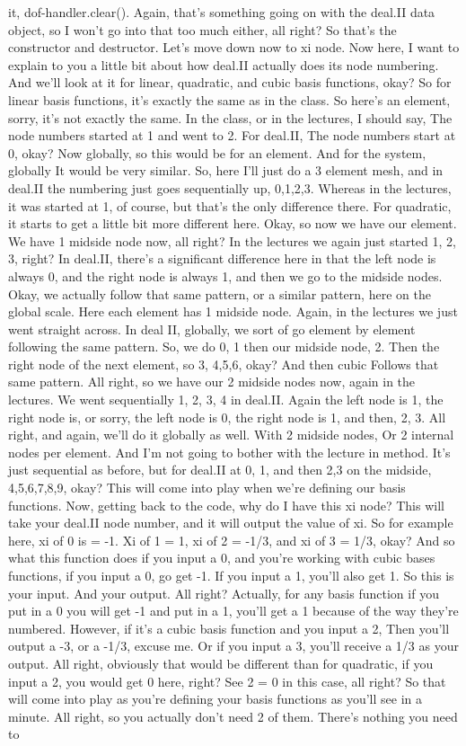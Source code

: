 \documentclass[10pt]{article}
\begin{document}
it, dof-handler.clear(). Again, that's something going on with the deal.II data object, so I won't go into that too much either, all right? So that's the constructor and destructor. Let's move down now to xi node. Now here, I want to explain to you a little bit about how deal.II actually does its node numbering. And we'll look at it for linear, quadratic, and cubic basis functions, okay? So for linear basis functions, it's exactly the same as in the class. So here's an element, sorry, it's not exactly the same. In the class, or in the lectures, I should say, The node numbers started at 1 and went to 2. For deal.II, The node numbers start at 0, okay? Now globally, so this would be for an element. And for the system, globally It would be very similar. So, here I'll just do a 3 element mesh, and in deal.II the numbering just goes sequentially up, 0,1,2,3. Whereas in the lectures, it was started at 1, of course, but that's the only difference there. For quadratic, it starts to get a little bit more different here. Okay, so now we have our element. We have 1 midside node now, all right? In the lectures we again just started 1, 2, 3, right? In deal.II, there's a significant difference here in that the left node is always 0, and the right node is always 1, and then we go to the midside nodes. Okay, we actually follow that same pattern, or a similar pattern, here on the global scale. Here each element has 1 midside node. Again, in the lectures we just went straight across. In deal II, globally, we sort of go element by element following the same pattern. So, we do 0, 1 then our midside node, 2. Then the right node of the next element, so 3, 4,5,6, okay? And then cubic Follows that same pattern. All right, so we have our 2 midside nodes now, again in the lectures. We went sequentially 1, 2, 3, 4 in deal.II. Again the left node is 1, the right node is, or sorry, the left node is 0, the right node is 1, and then, 2, 3. All right, and again, we'll do it globally as well. With 2 midside nodes, Or 2 internal nodes per element. And I'm not going to bother with the lecture in method. It's just sequential as before, but for deal.II at 0, 1, and then 2,3 on the midside, 4,5,6,7,8,9, okay? This will come into play when we're defining our basis functions. Now, getting back to the code, why do I have this xi node? This will take your deal.II node number, and it will output the value of xi. So for example here, xi of 0 is = -1. Xi of 1 = 1, xi of 2 = -1/3, and xi of 3 = 1/3, okay? And so what this function does if you input a 0, and you're working with cubic bases functions, if you input a 0, go get -1. If you input a 1, you'll also get 1. So this is your input. And your output. All right? Actually, for any basis function if you put in a 0 you will get -1 and put in a 1, you'll get a 1 because of the way they're numbered. However, if it's a cubic basis function and you input a 2, Then you'll output a -3, or a -1/3, excuse me. Or if you input a 3, you'll receive a 1/3 as your output. All right, obviously that would be different than for quadratic, if you input a 2, you would get 0 here, right? See 2 = 0 in this case, all right? So that will come into play as you're defining your basis functions as you'll see in a minute. All right, so you actually don't need 2 of them. There's nothing you need to 
\end{document}

